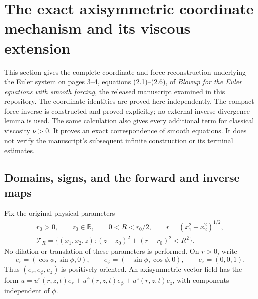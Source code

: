 \section{The exact axisymmetric coordinate mechanism and its viscous extension}
\label{sec:exact-euler-coordinates}

This section gives the complete coordinate and force reconstruction underlying
the Euler system on pages 3--4, equations (2.1)--(2.6), of
\emph{Blowup for the Euler equations with smooth forcing}, the released
manuscript examined in this repository.  The coordinate identities are proved
here independently.  The compact force inverse is constructed and proved
explicitly; no external inverse-divergence lemma is used.  The same calculation
also gives every additional term for classical viscosity \(\nu>0\).
It proves an exact correspondence of smooth equations.  It does not verify
the manuscript's subsequent infinite construction or its terminal estimates.

\subsection{Domains, signs, and the forward and inverse maps}

Fix the original physical parameters
\begin{gather*}
 r_0>0,\qquad z_0\in\mathbb R,\qquad 0<R<r_0/2,
 \qquad r=(x_1^2+x_2^2)^{1/2},\\
 \mathcal T_R=\{(x_1,x_2,z):(z-z_0)^2+(r-r_0)^2<R^2\}.
\end{gather*}
No dilation or translation of these parameters is performed.  On \(r>0\),
write
\[
 e_r=(\cos\phi,\sin\phi,0),\qquad
 e_\phi=(-\sin\phi,\cos\phi,0),\qquad e_z=(0,0,1).
\]
Thus \((e_r,e_\phi,e_z)\) is positively oriented.  An axisymmetric vector
field has the form
\(u=u^r(r,z,t)e_r+u^\phi(r,z,t)e_\phi+u^z(r,z,t)e_z\),
with components independent of \(\phi\).

